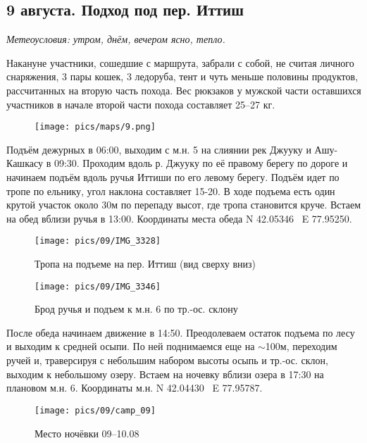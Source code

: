 \subsection{9 августа. Подход под пер. Иттиш}
\textit{Метеоусловия: утром, днём, вечером ясно, тепло.}

Накануне участники, сошедшие с маршрута, забрали с собой, не считая личного снаряжения, 3 пары кошек, 3 ледоруба, тент и чуть меньше половины продуктов, рассчитанных на вторую часть похода. Вес рюкзаков у мужской части оставшихся участников в начале второй части похода составляет 25--27 кг.

\begin{figure}[h!]
	\centering
	\texttt{[image: pics/maps/9.png]}
	\label{fig:mini_9}
\end{figure}

Подъём дежурных в 06:00, выходим с м.н. 5 на слиянии рек Джууку и Ашу-Кашкасу в 09:30. Проходим вдоль р. Джууку по её  правому берегу  по дороге и начинаем подъём вдоль ручья Иттиши по его левому берегу. Подъём идет по тропе по ельнику, угол наклона составляет 15-20\degree. В ходе подъема есть один крутой участок около 30м по перепаду высот, где тропа становится круче. Встаем на обед вблизи ручья в 13:00. Координаты места обеда N 42.05346\degree~ E 77.95250\degree.

\begin{figure}[h!]
	\centering
	\texttt{[image: pics/09/IMG\_3328]}
	\caption{Тропа на подъеме на пер. Иттиш (вид сверху вниз)}
	\label{fig:IMG_3328}
\end{figure}

\begin{figure}[h!]
	\centering
	\texttt{[image: pics/09/IMG\_3346]}
	\caption{Брод ручья и подъем к м.н. 6 по тр.-ос. склону}
	\label{fig:IMG_3346}
\end{figure}


После обеда начинаем движение в 14:50. Преодолеваем остаток подъема по лесу и выходим к средней осыпи. По ней поднимаемся еще на $\sim$100м, переходим ручей и, траверсируя с небольшим набором высоты осыпь и тр.-ос. склон, выходим к небольшому озеру. Встаем на ночевку вблизи озера в 17:30 на плановом м.н. 6. Координаты м.н. N 42.04430\degree~ E 77.95787\degree.


\begin{figure}[h!]
	\centering
	\texttt{[image: pics/09/camp\_09]} %
	\caption{Место ночёвки 09--10.08}
	\label{fig:camp_09}
\end{figure}

\clearpage